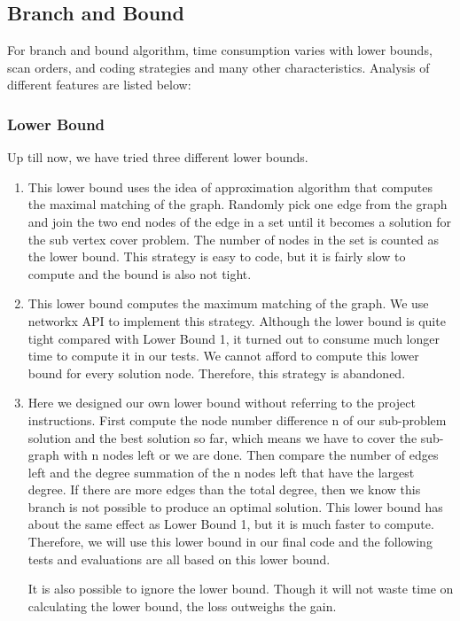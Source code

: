 \subsection{Branch and Bound}
For branch and bound algorithm, time consumption varies with lower bounds, scan orders, and coding strategies and many other characteristics. Analysis of different features are listed below:
\subsubsection{Lower Bound}
Up till now, we have tried three different lower bounds.
\begin{enumerate}
\item This lower bound uses the idea of approximation algorithm that computes the maximal matching of the graph. Randomly pick one edge from the graph and join the two end nodes of the edge in a set until it becomes a solution for the sub vertex cover problem. The number of nodes in the set is counted as the lower bound. This strategy is easy to code, but it is fairly slow to compute and the bound is also not tight.
\item This lower bound computes the maximum matching of the graph. We use networkx API to implement this strategy. Although the lower bound is quite tight compared with Lower Bound 1, it turned out to consume much longer time to compute it in our tests. We cannot afford to compute this lower bound for every solution node. Therefore, this strategy is abandoned.
\item Here we designed our own lower bound without referring to the project instructions. First compute the node number difference n of our sub-problem solution and the best solution so far, which means we have to cover the sub-graph with n nodes left or we are done. Then compare the number of edges left and the degree summation of the n nodes left that have the largest degree. If there are more edges than the total degree, then we know this branch is not possible to produce an optimal solution. This lower bound has about the same effect as Lower Bound 1, but it is much faster to compute. Therefore, we will use this lower bound in our final code and the following tests and evaluations are all based on this lower bound.

It is also possible to ignore the lower bound. Though it will not waste time on calculating the lower bound, the loss outweighs the gain.
\end{enumerate}

